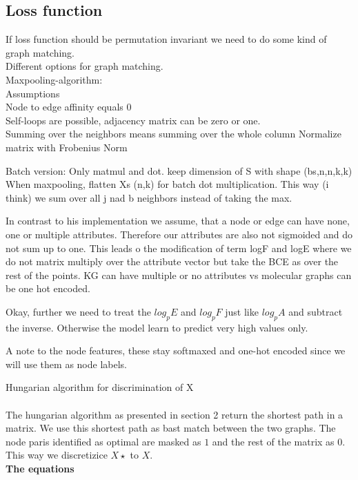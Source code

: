 \subsection{Loss function}

If loss function should be permutation invariant we need to do some kind of graph matching.\\
Different options for graph matching.\\
Maxpooling-algorithm:\\
Assumptions\\
Node to edge affinity equals 0\\

Self-loops are possible, adjacency matrix can be zero or one.\\

Summing over the neighbors means summing over the whole column
Normalize matrix with Frobenius Norm

Batch version:
Only matmul and dot. keep dimension of S with shape (bs,n,n,k,k)
When maxpooling, flatten Xs (n,k) for batch dot multiplication. This way (i think) we sum over all j nad b neighbors instead of taking the max.  



In contrast to his implementation we assume, that a node or edge can have none, one or multiple attributes. Therefore our attributes are also not sigmoided and do not sum up to one. This leads o the modification of term logF and logE where we do not matrix multiply over the attribute vector but take the BCE as over the rest of the points.
KG can have multiple or no attributes vs molecular graphs can be one hot encoded.

Okay, further we need to treat the $log_pE$ and $log_pF$ just like $log_pA$ and subtract the inverse. Otherwise the model learn to predict very high values only. 

A note to the node features, these stay softmaxed and one-hot encoded since we will use them as node labels.



Hungarian algorithm for discrimination of X \\
\\
The hungarian algorithm as presented in section 2 return the shortest path in a matrix. We use this shortest path as bast match between the two graphs. The node paris identified as optimal are masked as $1$ and the rest of the matrix as $0$. This way we discretizice $X\star$ to $X$. 
\\
\textbf{The equations}

